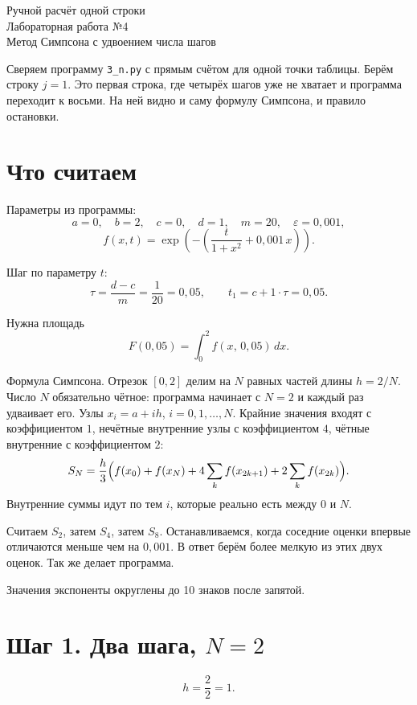 \documentclass[11pt,a4paper]{article}
\begin{document}
\begin{center}
{\Large Ручной расчёт одной строки}\\[0.4em]
{\large Лабораторная работа №4}\\[0.2em]
Метод Симпсона с удвоением числа шагов
\end{center}

Сверяем программу \texttt{3\_n.py} с прямым счётом для одной точки таблицы.
Берём строку \(j = 1\). Это первая строка, где четырёх шагов уже не хватает
и программа переходит к восьми. На ней видно и саму формулу Симпсона, и правило остановки.

\section*{Что считаем}

Параметры из программы:
\[
a = 0,\quad b = 2,\quad c = 0,\quad d = 1,\quad m = 20,\quad \varepsilon = 0{,}001,
\]
\[
f(x, t) = \exp\left(-\left(\frac{t}{1 + x^{2}} + 0{,}001\, x\right)\right).
\]

Шаг по параметру \(t\):
\[
\tau = \frac{d - c}{m} = \frac{1}{20} = 0{,}05,
\qquad
t_{1} = c + 1\cdot\tau = 0{,}05.
\]

Нужна площадь
\[
F(0{,}05) = \int_{0}^{2} f(x,\, 0{,}05)\, dx.
\]

Формула Симпсона. Отрезок \([0, 2]\) делим на \(N\) равных частей длины \(h = 2/N\).
Число \(N\) обязательно чётное: программа начинает с \(N = 2\) и каждый раз удваивает его.
Узлы \(x_{i} = a + ih\), \(i = 0, 1, \ldots, N\). Крайние значения входят с коэффициентом \(1\),
нечётные внутренние узлы с коэффициентом \(4\), чётные внутренние с коэффициентом \(2\):
\[
S_{N} = \frac{h}{3}\Bigl(
f(x_{0}) + f(x_{N})
+ 4\sum_{k} f(x_{2k+1})
+ 2\sum_{k} f(x_{2k})
\Bigr).
\]
Внутренние суммы идут по тем \(i\), которые реально есть между \(0\) и \(N\).

Считаем \(S_{2}\), затем \(S_{4}\), затем \(S_{8}\).
Останавливаемся, когда соседние оценки впервые отличаются меньше чем на \(0{,}001\).
В ответ берём более мелкую из этих двух оценок. Так же делает программа.

Значения экспоненты округлены до 10 знаков после запятой.

\section*{Шаг 1. Два шага, \(N = 2\)}

\[
h = \frac{2}{2} = 1.
\]
\end{document}
